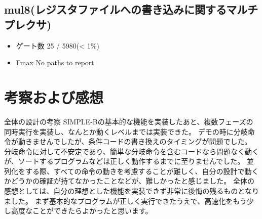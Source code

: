 \documentclass{jarticle}
\begin{document}
\subsection{mul8(レジスタファイルへの書き込みに関するマルチプレクサ)}
\label{sec-2-4}
\begin{itemize}
\item ゲート数 25 / 5980(< 1\%)
\item Fmax No paths to report
\end{itemize}

\section{考察および感想}
\label{sec-3}
全体の設計の考察
SIMPLE-Bの基本的な機能を実装したあと、複数フェーズの同時実行を実装し、なんとか動くレベルまでは実装できた。
デモの時に分岐命令が動きませんでしたが、条件コードの書き換えのタイミングが問題でした。
分岐命令に対して不安定であり、簡単な分岐命令を含むコードなら問題なく動くが、ソートするプログラムなどは正しく動作するまでに至りませんでした。
並列化をする際、すべての命令の動きを考慮することが難しく、自分の設計で動くかどうかの確証が持てなかったことなどが、難しかったと感じました。
全体の感想としては、自分の理想とした機能を実装できず非常に後悔の残るものとなりました。
まず基本的なプログラムが正しく実行できたうえで、高速化をもう少し高度なことができたらよかったと思います。
\end{document}
